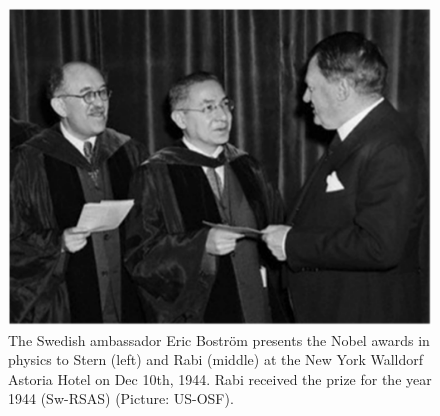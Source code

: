 \documentclass[12pt]{article}
\begin{document}
%
\begin{figure}
\begin{center}
\includegraphics[scale=0.45]{figures/Nobel_SternRabi}
\caption{The Swedish ambassador Eric Boström presents the Nobel awards in physics to Stern (left) and Rabi (middle) at the New York Walldorf Astoria Hotel on Dec 10th, 1944.  Rabi received the prize for the year 1944 (Sw-RSAS) (Picture: US-OSF). }
\label{fig:Nobel_SternRabi}
\end{center}
\end{figure}
\end{document}
